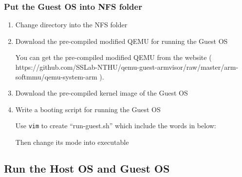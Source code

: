 \documentclass[12pt]{article}  %
\begin{document}
\subsubsection{Put the Guest OS into NFS folder}
\begin{enumerate}
\item Change directory into the NFS folder


\item Download the pre-compiled modified QEMU for running the Guest OS 

You can get the pre-compiled modified QEMU from the website ( https://github.com/SSLab-NTHU/qemu-guest-armvisor/raw/master/arm-softmmu/qemu-system-arm ).




\item Download the pre-compiled kernel image of the Guest OS




\item Write a booting script for running the Guest OS

Use \texttt{vim} to create ``run-guest.sh'' which include the words in below:


Then change its mode into executable


\end{enumerate}


\subsection{Run the Host OS and Guest OS}
\end{document}
